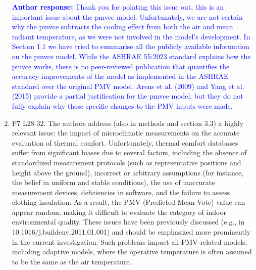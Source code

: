 \documentclass[a4paper, 10pt]{letter}
\newcommand{\response}[1]{\textcolor{blue}{\textbf{Author response:} #1}}
\begin{document}
\begin{letter}
\begin{enumerate}
            \response{
                Thank you for pointing this issue out, this is an important issue about the \ac{pmvce} model.
                Unfortunately, we are not certain why the \ac{pmvce} subtracts the cooling effect from both the air and mean radiant temperature, as we were not involved in the model's development.
                In Section 1.1 we have tried to summarise all the publicly available information on the \ac{pmvce} model.
                While the ASHRAE 55:2023 standard explains how the \ac{pmvce} works, there is no peer-reviewed publication that quantifies the accuracy improvements of the model as implemented in the ASHRAE standard over the original PMV model.
                Arens et al. (2009) and Yang et al. (2015) provide a partial justification for the \ac{pmvce} model, but they do not fully explain why these specific changes to the PMV inputs were made.
            }

            \item P7 L28-32.
            The authors address (also in methods and section 3.3) a highly relevant issue: the impact of microclimatic measurements on the accurate evaluation of thermal comfort.
            Unfortunately, thermal comfort databases suffer from significant biases due to several factors, including the absence of standardized measurement protocols (such as representative positions and height above the ground), incorrect or arbitrary assumptions (for instance, the belief in uniform and stable conditions), the use of inaccurate measurement devices, deficiencies in software, and the failure to assess clothing insulation.
            As a result, the PMV (Predicted Mean Vote) value can appear random, making it difficult to evaluate the category of indoor environmental quality.
            These issues have been previously discussed (e.g., in 10.1016/j.buildenv.2011.01.001) and should be emphasized more prominently in the current investigation.
            Such problems impact all PMV-related models, including adaptive models, where the operative temperature is often assumed to be the same as the air temperature.


\end{enumerate}
\end{letter}
\end{document}
